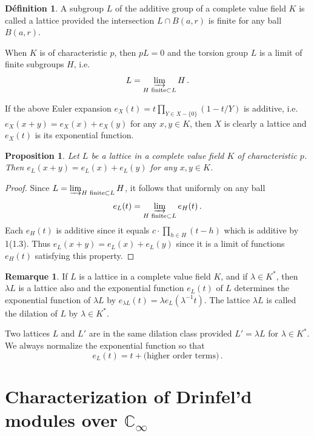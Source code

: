 \documentclass[12pt,a4paper]{article}
\theoremstyle{plain}
\newtheorem{proposition}{Proposition}[section]
\theoremstyle{definition}
\newtheorem{definition}{D\'efinition}[section]
\newtheorem{remark}{Remarque}[section]
\theoremstyle{remark}
\begin{document}
\begin{definition}
A subgroup $L$ of the additive group of a complete value field $K$ is called 
a lattice provided the intersection $L \cap B(a,r)$ is finite for any ball 
$B(a,r)$.
\end{definition}

When $K$ is of characteristic $p$, then $pL = 0$ and the torsion group $L$ is 
a limit of finite subgroups $H$, i.e.
\[
L = \varinjlim_{H \text{ finite} \subset L} H \,.
\]

If the above Euler expansion $e_X(t) = t \prod_{Y \in X - \{0\}}(1 - t/Y)$ is 
additive, i.e. $e_X(x+y) = e_X(x) + e_X(y)$ for any $x,y \in K$, then $X$ is 
clearly a lattice and $e_X(t)$ is its exponential function.

\begin{proposition}
Let $L$ be a lattice in a complete value field $K$ of characteristic $p$. 
Then $e_L(x+y) = e_L(x) + e_L(y)$ for any $x, y \in K$.
\end{proposition}

\begin{proof}
Since $L = \varinjlim_{H \text{ finite} \subset L} H$, it follows that uniformly 
on any ball
\[
e_L(t) = \varinjlim_{H \text{ finite} \subset L} e_H(t) \,.
\]
Each $e_H(t)$ is additive since it equals $c \cdot \prod_{h \in H}(t-h)$ which 
is additive by 1(1.3). Thus $e_L(x+y) = e_L(x) + e_L(y)$ since it is a limit 
of functions $e_H(t)$ satisfying this property.
\end{proof}

\begin{remark}
If $L$ is a lattice in a complete value field $K$, and if $\lambda \in K^*$, 
then $\lambda L$ is a lattice also and the exponential function $e_L(t)$ of $L$ 
determines the exponential function of $\lambda L$ by 
$e_{\lambda L}(t) = \lambda e_L(\lambda^{-1}t)$. The lattice $\lambda L$ is 
called the dilation of $L$ by $\lambda \in K^*$.

Two lattices $L$ and $L'$ are in the same dilation class provided $L' = \lambda L$ 
for $\lambda \in K^*$. We always normalize the exponential function so that
\[
e_L(t) = t + \text{(higher order terms)} \,.
\]
\end{remark}


\section{Characterization of Drinfel'd modules over $\mathbb{C}_\infty$}
\end{document}

